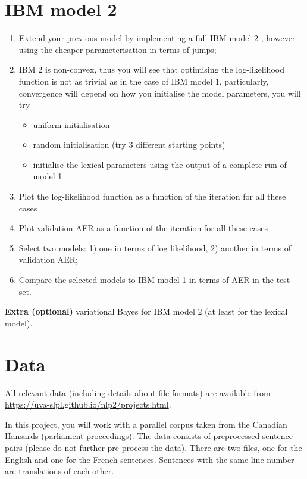 
\section{IBM model 2}

\begin{enumerate}
  \item Extend your previous model by implementing a full IBM model 2 \citep{Brown+1993:smt}, however using the cheaper parameterisation in terms of jumps;
  \item IBM 2 is non-convex, thus you will see that optimising the log-likelihood function is 
        not as trivial as in the case of IBM model 1, particularly, convergence will depend 
        on how you initialise the model parameters, you will try
  \begin{itemize}
    \item uniform initialisation
    \item random initialisation (try 3 different starting points)
    \item initialise the lexical parameters using the output of a complete run of model 1
  \end{itemize}
  \item Plot the log-likelihood function as a function of the iteration for all these cases
  \item Plot validation AER as a function of the iteration for all these cases
  \item Select two models: 1) one in terms of log likelihood, 2) another in terms of validation AER;
  \item Compare the selected models to IBM model 1 in terms of AER in the test set.
\end{enumerate}

{\bf Extra (optional)} variational Bayes for IBM model 2 (at least for the lexical model).

\section{Data}

All relevant data (including details about file formats) are available from \url{https://uva-slpl.github.io/nlp2/projects.html}.

In this project, you will work with a parallel corpus taken from the Canadian Hansards (parliament proceedings). 
The data consists
of preprocessed sentence pairs (please do not further pre-process the data). There are two files, one for the
English and one for the French sentences. Sentences with the same line number are translations of each other.

